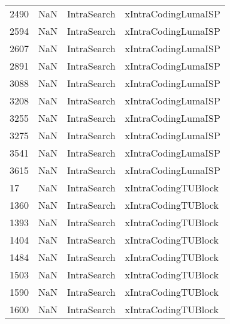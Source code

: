 \begin{tabular}{llll}
2490 &                   NaN &                IntraSearch &                       xIntraCodingLumaISP \\
2594 &                   NaN &                IntraSearch &                       xIntraCodingLumaISP \\
2607 &                   NaN &                IntraSearch &                       xIntraCodingLumaISP \\
2891 &                   NaN &                IntraSearch &                       xIntraCodingLumaISP \\
3088 &                   NaN &                IntraSearch &                       xIntraCodingLumaISP \\
3208 &                   NaN &                IntraSearch &                       xIntraCodingLumaISP \\
3255 &                   NaN &                IntraSearch &                       xIntraCodingLumaISP \\
3275 &                   NaN &                IntraSearch &                       xIntraCodingLumaISP \\
3541 &                   NaN &                IntraSearch &                       xIntraCodingLumaISP \\
3615 &                   NaN &                IntraSearch &                       xIntraCodingLumaISP \\
17   &                   NaN &                IntraSearch &                       xIntraCodingTUBlock \\
1360 &                   NaN &                IntraSearch &                       xIntraCodingTUBlock \\
1393 &                   NaN &                IntraSearch &                       xIntraCodingTUBlock \\
1404 &                   NaN &                IntraSearch &                       xIntraCodingTUBlock \\
1484 &                   NaN &                IntraSearch &                       xIntraCodingTUBlock \\
1503 &                   NaN &                IntraSearch &                       xIntraCodingTUBlock \\
1590 &                   NaN &                IntraSearch &                       xIntraCodingTUBlock \\
1600 &                   NaN &                IntraSearch &                       xIntraCodingTUBlock \\

\end{tabular}
